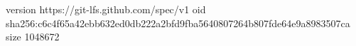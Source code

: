version https://git-lfs.github.com/spec/v1
oid sha256:c6c4f65a42ebb632ed0db222a2bfd9fba5640807264b807fde64e9a8983507ca
size 1048672
